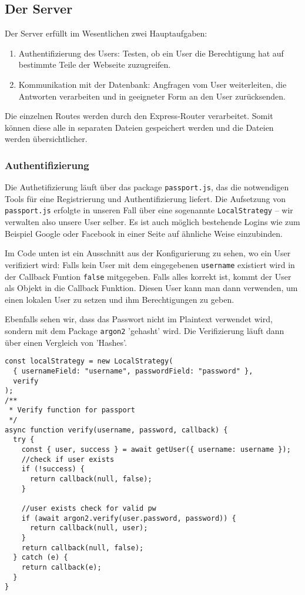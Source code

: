 \subsection{Der Server}

Der Server erfüllt im Wesentlichen zwei Hauptaufgaben:
\begin{enumerate}
    \item Authentifizierung des Users: Testen, ob ein User die Berechtigung hat auf bestimmte Teile der Webseite zuzugreifen.
    \item Kommunikation mit der Datenbank: Angfragen vom User weiterleiten, die Antworten verarbeiten und in geeigneter Form an den User zurücksenden.
\end{enumerate}

Die einzelnen Routes werden durch den Express-Router verarbeitet. Somit können diese alle in separaten Dateien gespeichert werden und die Dateien werden übersichtlicher.

\subsubsection{Authentifizierung}
Die Authetifizierung läuft über das package \verb|passport.js|, das die notwendigen Tools für eine Registrierung und Authentifizierung liefert. Die Aufsetzung von \verb|passport.js| erfolgte in unseren Fall über eine sogenannte \verb|LocalStrategy| -- wir verwalten also unsere User selber. Es ist auch möglich bestehende Logins wie zum Beispiel Google oder Facebook in einer Seite auf ähnliche Weise einzubinden. 

Im Code unten ist ein Ausschnitt aus der Konfigurierung zu sehen, wo ein User verifiziert wird: Falls kein User mit dem eingegebenen \verb|username| existiert wird in der Callback Funtion \verb|false| mitgegeben. Falls alles korrekt ist, kommt der User als Objekt in die Callback Funktion. Diesen User kann man dann verwenden, um einen lokalen User zu setzen und ihm Berechtigungen zu geben.

Ebenfalls sehen wir, dass das Passwort nicht im Plaintext verwendet wird, sondern mit dem Package \verb|argon2| 'gehasht' wird. Die Verifizierung läuft dann über einen Vergleich von 'Hashes'. 

 \newpage

\begin{lstlisting}
const localStrategy = new LocalStrategy(
  { usernameField: "username", passwordField: "password" },
  verify
);
/**
 * Verify function for passport
 */
async function verify(username, password, callback) {
  try {
    const { user, success } = await getUser({ username: username });
    //check if user exists
    if (!success) {
      return callback(null, false);
    }

    //user exists check for valid pw
    if (await argon2.verify(user.password, password)) {
      return callback(null, user);
    }
    return callback(null, false);
  } catch (e) {
    return callback(e);
  }
}
\end{lstlisting}

